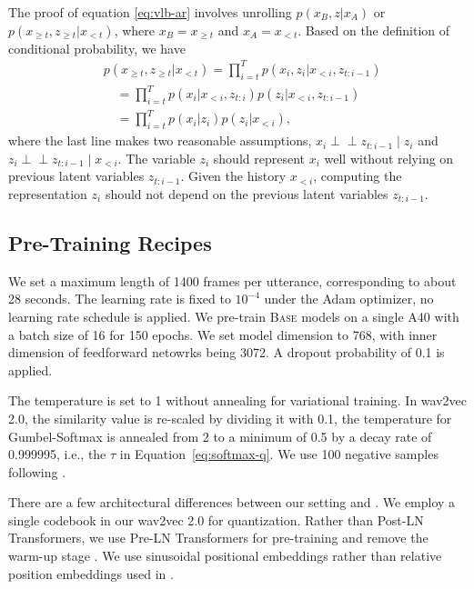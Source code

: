 \documentclass[11pt,a4paper]{article}
\def\Eqref#1{Equation~\ref{#1}}
\newcommand{\ind}{\perp\!\!\!\!\perp}
\begin{document}
The proof of equation \ref{eq:vlb-ar} involves unrolling $p(x_B, z | x_A)$ or $p(x_{\geq t}, z_{\geq t} | x_{< t})$, where $x_B = x_{\geq t}$ and $x_A = x_{< t}$.
Based on the definition of conditional probability, we have
\begin{align}
&p(x_{\geq t}, z_{\geq t} | x_{< t}) = \prod_{i=t}^T p(x_i, z_i | x_{< i}, z_{t:i-1}) \\
&\quad = \prod_{i=t}^T p(x_i | x_{< i}, z_{t:i}) p(z_i | x_{< i}, z_{t:i-1}) \\
&\quad = \prod_{i=t}^T p(x_i | z_i) p(z_i | x_{< i}),
\end{align}
where the last line makes two reasonable assumptions, $x_i \ind z_{t:i-1} \mid z_i$ and $z_i \ind z_{t:i-1} \mid x_{< i}$.
The variable $z_i$ should represent $x_i$ well without relying on previous latent variables $z_{t:i-1}$.
Given the history $x_{< i}$, computing the representation $z_i$ should not depend on the previous latent variables $z_{t:i-1}$.

%
%

%
%
%
%
%
%
%

%

%
%
%
%
%
%
%
%
%
%
%
%
%

%
%
%
%

\subsection{Pre-Training Recipes}
\label{appendix:recipe}

%
%
%
%
We set a maximum length of 1400 frames per utterance, 
corresponding to about 28 seconds. The learning rate is fixed to $10^{-4}$ under the Adam optimizer,
no learning rate schedule is applied.
We pre-train
\textsc{Base} models on a single A40 with a batch size of 16 for 150 epochs. 
We set model dimension to 768, with inner dimension of feedforward netowrks being 3072.
A dropout probability of 0.1 is applied.

The temperature is set to 1 without annealing for variational training.
In wav2vec 2.0, the similarity value is re-scaled by dividing it with 0.1, 
the temperature for Gumbel-Softmax \citep{jang2016categorical} is annealed from 2 to a minimum of 0.5 by a decay rate of 0.999995,
i.e., the $\tau$ in \Eqref{eq:softmax-q}.
We use 100 negative samples following \citet{baevski2020wav2vec}.

There are a few architectural differences between our setting and \citet{baevski2020wav2vec}.
%
%
We employ a single codebook in our wav2vec 2.0 for quantization.
%
%
%
Rather than Post-LN Transformers, 
we use Pre-LN Transformers for pre-training
and remove the warm-up stage \citep{geiping2023cramming,xiong2020layer}.
We use sinusoidal positional embeddings rather than relative position embeddings used in 
\citet{baevski2020wav2vec}.
\end{document}
